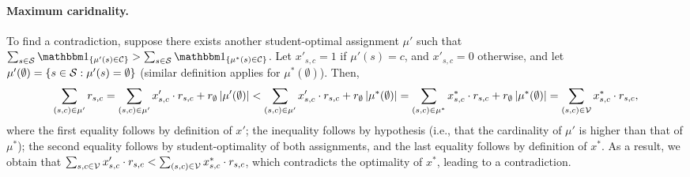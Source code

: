                 \paragraph{Maximum caridnality.} To find a contradiction, suppose there exists another student-optimal assignment \(\mu'\) such that \(\sum_{s\in \cS} \ind{\mu'(s) \in \cC} > \sum_{s\in \cS} \ind{\mu^*(s) \in \cC}\). Let \(x'_{s,c} = 1\) if \(\mu'(s) = c\), and \(x'_{s,c} = 0\) otherwise, and let
                \(\mu'(\emptyset) = \left\{s\in \mathcal{S}: \mu'(s) = \emptyset\right\}\) (similar definition applies for \(\mu^*(\emptyset)\)). Then,
                \[
                \sum_{(s,c)\in \mu'} r_{s,c} = \sum_{(s,c)\in \mu'} x'_{s,c}\cdot r_{s,c} + r_{\emptyset} \left|\mu'(\emptyset)\right| < \sum_{(s,c)\in \mu'} x'_{s,c}\cdot r_{s,c} + r_{\emptyset} \left|\mu^*(\emptyset)\right| = \sum_{(s,c)\in \mu^*} x^*_{s,c}\cdot r_{s,c} + r_{\emptyset} \left|\mu^*(\emptyset)\right| = \sum_{(s,c) \in \mathcal{V}} x^*_{s,c}\cdot r_{s,c},
                \]
                where the first equality follows by definition of \(x'\); the inequality follows by hypothesis (i.e., that the cardinality of \(\mu'\) is higher than that of \(\mu^*\)); the second equality follows by student-optimality of both assignments, and the last equality follows by definition of \(x^*\). As a result, we obtain that \(\sum_{s,c\in \mathcal{V}} x'_{s,c}\cdot r_{s,c} < \sum_{(s,c) \in \mathcal{V}} x^*_{s,c} \cdot r_{s,c}\), which contradicts the optimality of \(x^*\), leading to a contradiction.
            \Halmos\endproof



